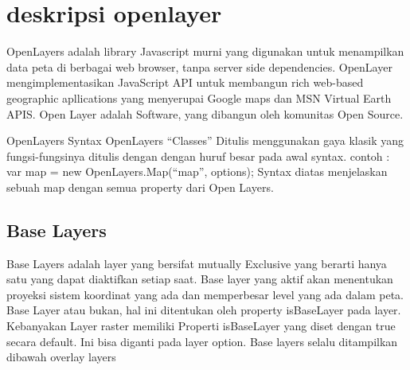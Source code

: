 
\section{deskripsi openlayer}
  OpenLayers adalah library Javascript murni yang digunakan untuk menampilkan data peta di berbagai web browser, tanpa server side dependencies.
  OpenLayer mengimplementasikan JavaScript API untuk membangun rich web-based geographic apllications yang menyerupai Google maps dan MSN Virtual Earth APIS.
  Open Layer adalah Software, yang dibangun oleh komunitas Open Source.
  
  OpenLayers Syntax
  OpenLayers “Classes”
  Ditulis menggunakan gaya klasik yang fungsi-fungsinya ditulis dengan dengan huruf besar pada awal syntax.
  contoh : var map = new OpenLayers.Map(“map”, options);
  Syntax diatas menjelaskan sebuah map dengan semua property dari Open Layers. 
  
\subsection{Base Layers}
 Base Layers adalah layer yang bersifat mutually Exclusive yang berarti hanya satu yang dapat diaktifkan setiap saat. Base layer yang aktif akan menentukan proyeksi sistem koordinat yang ada dan memperbesar level yang ada dalam peta. Base Layer atau bukan, hal ini ditentukan oleh property isBaseLayer pada layer. Kebanyakan Layer raster memiliki Properti isBaseLayer yang diset dengan true secara default. Ini bisa diganti pada layer option. Base layers selalu ditampilkan dibawah overlay layers

